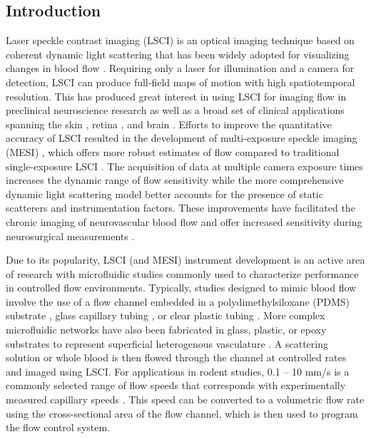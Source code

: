 \documentclass[12pt]{spieman}
\begin{document}
\begin{spacing}{2}


\section{Introduction}
\label{sect:introduction}

Laser speckle contrast imaging (LSCI) is an optical imaging technique based on coherent dynamic light scattering that has been widely adopted for visualizing changes in blood flow \cite{Briers:2001hy,Boas:2010vr}. Requiring only a laser for illumination and a camera for detection, LSCI can produce full-field maps of motion with high spatiotemporal resolution. This has produced great interest in using LSCI for imaging flow in preclinical neuroscience research \cite{Ayata:2004ba,Durduran.2004,Nakamura:2010wp,He:2020} as well as a broad set of clinical applications spanning the skin \cite{Roustit.2010,Mahe.2012}, retina \cite{Briers.1982,Feng.2022}, and brain \cite{Hecht:2009gu,Parthasarathy:2010gh,Klijn:2012ls,Miller.2022}. Efforts to improve the quantitative accuracy of LSCI resulted in the development of multi-exposure speckle imaging (MESI) \cite{Parthasarathy:2008el}, which offers more robust estimates of flow compared to traditional single-exposure LSCI \cite{Parthasarathy:2010vo,Kazmi:2013hp}. The acquisition of data at multiple camera exposure times increases the dynamic range of flow sensitivity while the more comprehensive dynamic light scattering model better accounts for the presence of static scatterers and instrumentation factors. These improvements have facilitated the chronic imaging of neurovascular blood flow \cite{Schrandt:2015gu,Clark:20194vi,Williamson.2020,Sullender.2022} and offer increased sensitivity during neurosurgical measurements \cite{Richards:2017df}.

Due to its popularity, LSCI (and MESI) instrument development is an active area of research with microfluidic studies commonly used to characterize performance in controlled flow environments. Typically, studies designed to mimic blood flow involve the use of a flow channel embedded in a polydimethylsiloxane (PDMS) substrate \cite{Parthasarathy:2008el}, glass capillary tubing \cite{Arias-Cruz.2019}, or clear plastic tubing \cite{Miao:2014}. More complex microfluidic networks have also been fabricated in glass, plastic, or epoxy substrates to represent superficial heterogenous vasculature \cite{Luu.2012}. A scattering solution \cite{Parthasarathy:2008el,Arias-Cruz.2019} or whole blood \cite{Miao:2014} is then flowed through the channel at controlled rates and imaged using LSCI. For applications in rodent studies, 0.1 -- 10 mm/s is a commonly selected range of flow speeds that corresponds with experimentally measured capillary speeds \cite{Tomita:2008do}. This speed can be converted to a volumetric flow rate using the cross-sectional area of the flow channel, which is then used to program the flow control system.


\end{spacing}
\end{document}
